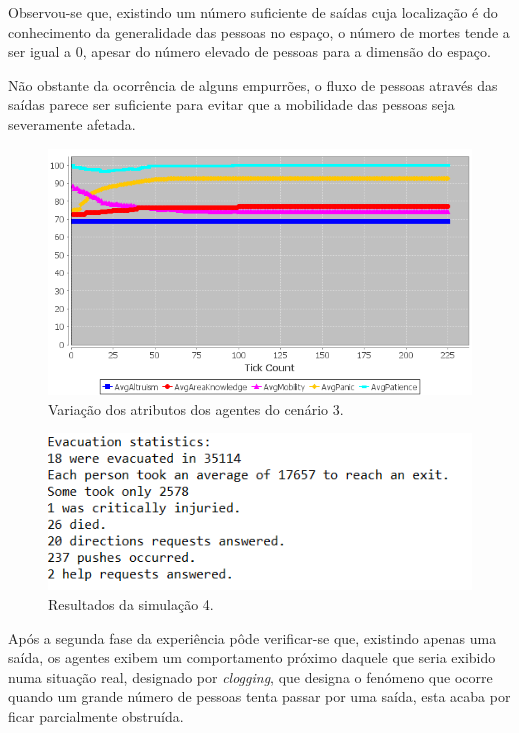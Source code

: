\documentclass[12pt]{article}
\begin{document}
\begin{titlepage}
\begin{itemize}
Observou-se que, existindo um número suficiente de saídas cuja localização é do conhecimento da generalidade das pessoas no espaço, o número de mortes tende a ser igual a 0, apesar do número elevado de pessoas para a dimensão do espaço. 

Não obstante da ocorrência de alguns empurrões, o fluxo de pessoas através das saídas parece ser suficiente para evitar que a mobilidade das pessoas seja severamente afetada.

\begin{figure}[H]
	\centering
	\includegraphics{graph_sc3.png}
	\caption{Variação dos atributos dos agentes do cenário 3.}
	\label{graph_sc3}
\end{figure}

\begin{figure}[H]
	\centering
	\includegraphics{log_sc4.png}
	\caption{Resultados da simulação 4.}
	\label{log_sc4}
\end{figure}

Após a segunda fase da experiência pôde verificar-se que, existindo apenas uma saída, os agentes exibem um comportamento próximo daquele que seria exibido numa situação real, designado por \textit{clogging}, que designa o fenómeno que ocorre quando um grande número de pessoas tenta passar por uma saída, esta acaba por ficar parcialmente obstruída. 


\end{itemize}
\end{titlepage}
\end{document}

